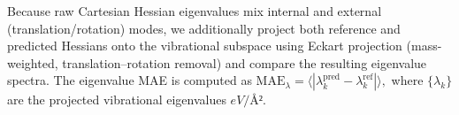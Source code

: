 \documentclass[pdflatex,sn-mathphys-num]{sn-jnl}%
\theoremstyle{thmstyleone}%
\theoremstyle{thmstyletwo}%
\theoremstyle{thmstylethree}%
\begin{document}
\begin{appendices}
Because raw Cartesian Hessian eigenvalues mix internal and external (translation/rotation) modes, we additionally project both reference and predicted Hessians onto the vibrational subspace using Eckart projection (mass-weighted, translation–rotation removal) and compare the resulting eigenvalue spectra. The eigenvalue MAE is computed as
\(
\mathrm{MAE}_\lambda = \langle |\lambda^{\mathrm{pred}}_k - \lambda^{\mathrm{ref}}_k| \rangle,
\)
where \(\{\lambda_k\}\) are the projected vibrational eigenvalues $eV/Å²$. 


\end{appendices}

\end{document}
